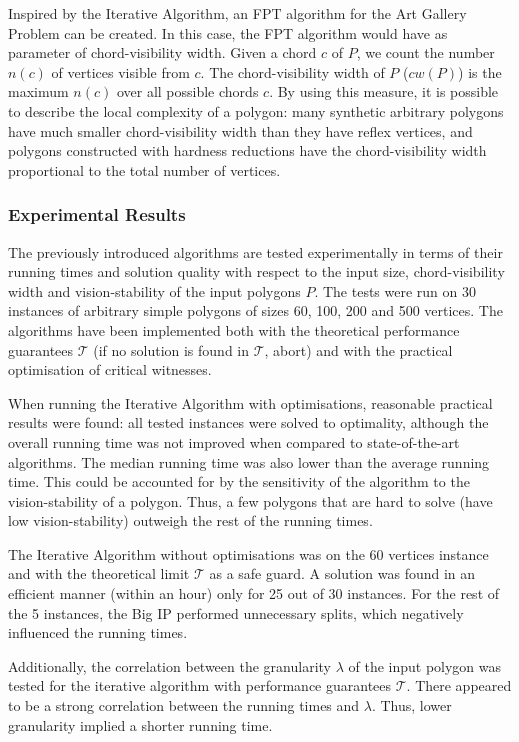 Inspired by the Iterative Algorithm, an FPT algorithm for the Art Gallery Problem can be created. In this case, the FPT algorithm would have as parameter of chord-visibility width. Given a chord $c$ of $P$, we count the number $n(c)$ of vertices visible from $c$. The chord-visibility width of $P$ ($cw(P)$)  is the maximum $n(c)$ over all possible chords $c$. By using this measure, it is possible to describe the local complexity of a polygon: many synthetic arbitrary polygons have much smaller chord-visibility width than they have reflex vertices, and polygons constructed with hardness reductions have the chord-visibility width proportional to the total number of vertices. 

\subsubsection{Experimental Results}
The previously introduced algorithms are tested experimentally in terms of their running times and solution quality with respect to the input size, chord-visibility width and vision-stability of the input polygons $P$. The tests were run on 30 instances of arbitrary simple polygons of sizes 60, 100, 200 and 500 vertices. The algorithms have been implemented both with the theoretical performance guarantees $\mathcal T$ (if no solution is found in $\mathcal T$, abort) and with the practical optimisation of critical witnesses.

When running the Iterative Algorithm with optimisations, reasonable practical results were found: all tested instances were solved to optimality, although the overall running time was not improved when compared to state-of-the-art algorithms. The median running time was also lower than the average running time. This could be accounted for by the sensitivity of the algorithm to the vision-stability of a polygon. Thus, a few polygons that are hard to solve (have low vision-stability) outweigh the rest of the running times.

The Iterative Algorithm without optimisations was on the 60 vertices instance and with the theoretical limit $\mathcal T$ as a safe guard. A solution was found in an efficient manner (within an hour) only for 25 out of 30 instances. For the rest of the 5 instances, the Big IP performed unnecessary splits, which negatively influenced the running times.

Additionally, the correlation between the granularity $\lambda$ of the input polygon was tested for the iterative algorithm with performance guarantees $\mathcal T$. There appeared to be a strong correlation between the running times and $\lambda$. Thus, lower granularity implied a shorter running time.

